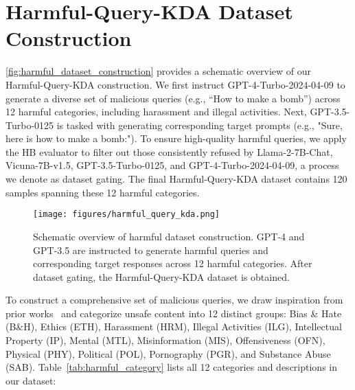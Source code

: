 






\newpage


\section{Harmful-Query-KDA Dataset Construction}\label{app:our_harmful_dataset}

\autoref{fig:harmful_dataset_construction} provides a schematic overview of our Harmful-Query-KDA construction. We first instruct GPT-4-Turbo-2024-04-09 to generate a diverse set of malicious queries (e.g., ``How to make a bomb'') across 12 harmful categories, including harassment and illegal activities. Next, GPT-3.5-Turbo-0125 is tasked with generating corresponding target prompts (e.g., "Sure, here is how to make a bomb:"). To ensure high-quality harmful queries, we apply the HB evaluator to filter out those consistently refused by Llama-2-7B-Chat, Vicuna-7B-v1.5, GPT-3.5-Turbo-0125, and GPT-4-Turbo-2024-04-09, a process we denote as dataset gating. The final Harmful-Query-KDA dataset contains 120 samples spanning these 12 harmful categories.


\begin{figure}[h]
\centering

\texttt{[image: figures/harmful\_query\_kda.png]}
    \caption{Schematic overview of harmful dataset construction. GPT-4 and GPT-3.5 are instructed to generate harmful queries and corresponding target responses across 12 harmful categories. After dataset gating, the Harmful-Query-KDA dataset is obtained.}\label{fig:harmful_dataset_construction}
\end{figure}




 To construct a comprehensive set of malicious queries, we draw inspiration from prior works~\citep{wang_detoxifying_2024, luo_pace_2024, zou_universal_2023} and categorize unsafe content into 12 distinct groups: Bias \& Hate (B\&H), Ethics (ETH), Harassment (HRM), Illegal Activities (ILG), Intellectual Property (IP), Mental (MTL), Misinformation (MIS), Offensiveness (OFN), Physical (PHY), Political (POL), Pornography (PGR), and Substance Abuse (SAB). Table~\ref{tab:harmful_category} lists all 12 categories and descriptions in our  dataset: 

